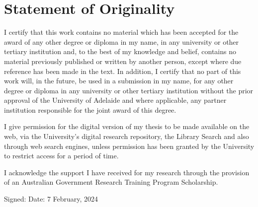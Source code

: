 \chapter{Statement of Originality}
 {
  I certify that this work contains no material which has been accepted for the award of any other degree or diploma in my name, in any university or other tertiary institution and, to the best of my knowledge and belief, contains no material previously published or written by another person, except where due reference has been made in the text. In addition, I certify that no part of this work will, in the future, be used in a submission in my name, for any other degree or diploma in any university or other tertiary institution without the prior approval of the University of Adelaide and where applicable, any partner institution responsible for the joint award of this degree.

  I give permission for the digital version of my thesis to be made available on the web, via the University’s digital research repository, the Library Search and also through web search engines, unless permission has been granted by the University to restrict access for a period of time.

  I acknowledge the support I have received for my research through the provision of an Australian Government Research Training Program Scholarship.

  \vspace{4ex}
  Signed: \dotfill\quad
  Date: 7 February, 2024 %

 }
